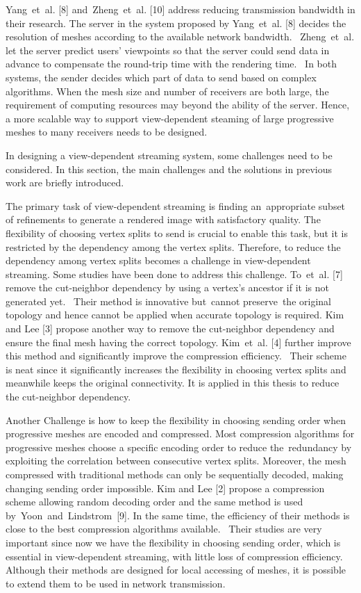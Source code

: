 \documentclass[11pt, a4paper]{report}
\begin{document}
    Yang et al. [8] and Zheng et al. [10] address reducing transmission bandwidth in their research. 
    The server in the system proposed by Yang et al. [8] decides the resolution of meshes
    according to the available network bandwidth. 
    Zheng et al. let the server predict users' viewpoints so that the server could send data in advance 
    to compensate the round-trip time with the rendering time. 
    In both systems, the sender decides which part of data to send based on complex algorithms. 
    When the mesh size and number of receivers are both large, the requirement of computing resources
    may beyond the ability of the server. 
    Hence, a more scalable way to support view-dependent steaming of large progressive meshes 
    to many receivers needs to be designed.
    
    In designing a view-dependent streaming system, 
    some challenges need to be considered. 
    In this section, the main challenges and the solutions in previous work are briefly introduced.

    The primary task of view-dependent streaming is finding an appropriate subset of refinements
    to generate a rendered image with satisfactory quality. 
    The flexibility of choosing vertex splits to send is crucial to enable this task, 
    but it is restricted by the dependency among the vertex splits. 
    Therefore, to reduce the dependency among vertex splits becomes a challenge in view-dependent streaming. 
    Some studies have been done to address this challenge. 
    To et al. [7] remove the cut-neighbor dependency by using a vertex's ancestor if it is not generated yet. 
    Their method is innovative but cannot preserve the original topology 
    and hence cannot be applied when accurate topology is required. 
    Kim and Lee [3] propose another way to remove the cut-neighbor dependency 
    and ensure the final mesh having the correct topology. 
    Kim et al. [4] further improve this method and significantly improve the compression efficiency. 
     Their scheme is neat since it significantly increases the flexibility in choosing vertex splits
    and meanwhile keeps the original connectivity. 
    It is applied in this thesis to reduce the cut-neighbor dependency.

    Another Challenge is how to keep the flexibility in choosing sending order
    when progressive meshes are encoded and compressed. 
    Most compression algorithms for progressive meshes choose a specific encoding order
    to reduce the redundancy by exploiting the correlation between consecutive vertex splits. 
    Moreover, the mesh compressed with traditional methods can only be sequentially decoded, 
    making changing sending order impossible. 
    Kim and Lee [2] propose a compression scheme allowing random decoding order
    and the same method is used by Yoon and Lindstrom [9]. 
    In the same time, the efficiency of their methods is close to the best compression algorithms available. 
    Their studies are very important since now we have the flexibility in choosing sending order, 
    which is essential in view-dependent streaming, with little loss of compression efficiency. 
    Although their methods are designed for local accessing of meshes, 
    it is possible to extend them to be used in network transmission. 
\end{document}
